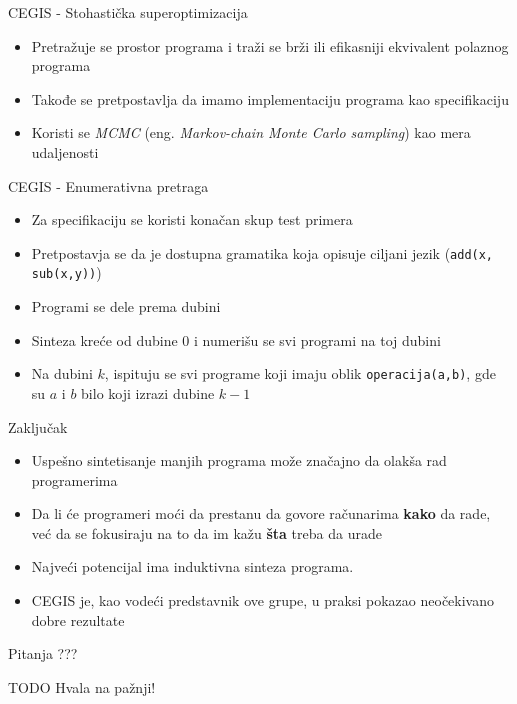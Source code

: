 \documentclass{beamer}
\begin{document}
\begin{frame}{CEGIS - Stohastička superoptimizacija}
    \begin{itemize}
        \item Pretražuje se prostor programa i traži se brži ili efikasniji ekvivalent polaznog programa
        \item Takođe se pretpostavlja da imamo implementaciju programa kao specifikaciju
        \item Koristi se \emph{MCMC} (eng. \emph{Markov-chain Monte Carlo sampling}) kao mera udaljenosti
    \end{itemize}
\end{frame}

\begin{frame}{CEGIS - Enumerativna pretraga}
    \begin{itemize}
        \item Za specifikaciju se koristi konačan skup test primera
        \item Pretpostavja se da je dostupna gramatika koja opisuje ciljani jezik (\texttt{add(x, sub(x,y))})
        \item Programi se dele prema dubini
        \item Sinteza kreće od dubine $0$ i numerišu se svi programi na toj dubini
        \item Na dubini $k$, ispituju se svi programe koji imaju oblik \texttt{operacija(a,b)}, gde su $a$ i $b$ bilo koji izrazi dubine $k-1$
    \end{itemize}
\end{frame}

\begin{frame}{Zaključak}
    \centering
    \begin{itemize}
        \item Uspešno sintetisanje manjih programa može značajno da olakša rad programerima
        \item Da li će programeri moći da prestanu da govore računarima \textbf{kako} da rade, već da se fokusiraju na to da im kažu \textbf{šta} treba da urade
        \item Najveći potencijal ima induktivna sinteza programa.
        \item CEGIS je, kao vodeći predstavnik ove grupe, u praksi pokazao neočekivano dobre rezultate
    \end{itemize}
\end{frame}

\begin{frame}{Pitanja}
    \centering
    ???
\end{frame}

\begin{frame}{TODO}
    \centering
    Hvala na pažnji!
\end{frame}
\end{document}
